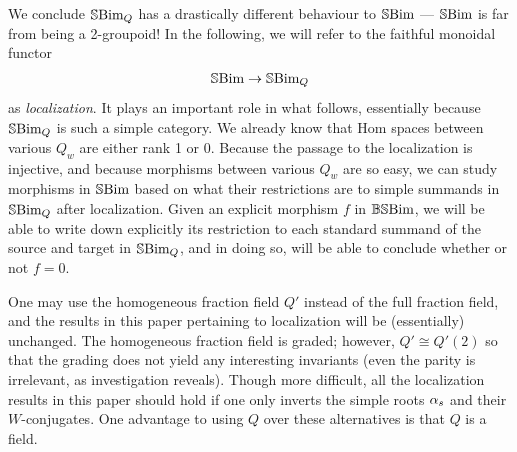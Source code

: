 We conclude $\mathbb{S}\textrm{Bim}_Q$ has a drastically different behaviour to $\mathbb{S}\textrm{Bim}$ --- $\mathbb{S}\textrm{Bim}$ is far from being a 2-groupoid! In the following, we will refer to the faithful monoidal functor
\begin{gather*}
\mathbb{S}\textrm{Bim} \rightarrow \mathbb{S}\textrm{Bim}_Q
\end{gather*}
as \emph{localization}. It plays an important role in what follows, essentially because $\mathbb{S}\textrm{Bim}_Q$ is such a simple category. We already know that Hom spaces between various $Q_w$ are either rank 1 or 0. Because the passage to the localization is injective, and because morphisms between various $Q_w$ are so easy,
we can study morphisms in $\mathbb{S}\textrm{Bim}$ based on what their restrictions are to simple summands in $\mathbb{S}\textrm{Bim}_Q$ after localization. Given an explicit morphism $f$ in $\mathbb{BS}\textrm{Bim}$, we will be able to
write down explicitly its restriction to each standard summand of the source and target in $\mathbb{S}\textrm{Bim}_Q$, and in doing so, will be able to conclude whether or not $f=0$.

\begin{remark} One may use the homogeneous fraction field $Q'$ instead of the full fraction field, and the results in this paper pertaining to localization will be (essentially) unchanged.
The homogeneous fraction field is graded; however, $Q' \cong Q'(2)$ so that the grading does not yield any interesting invariants (even the parity is irrelevant, as investigation reveals).
Though more difficult, all the localization results in this paper should hold if one only inverts the simple roots $\alpha_s$ and their $W$-conjugates. One advantage to using
$Q$ over these alternatives is that $Q$ is a field. \end{remark}

